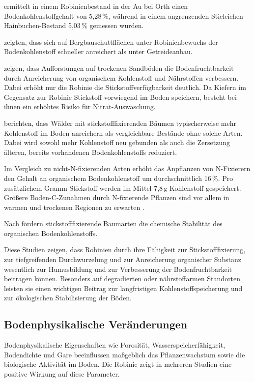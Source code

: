 \documentclass[twocolumn]{scrartcl}
\begin{document}
\citet{kastler2013robinieBoden} ermittelt in einem Robinienbestand in der Au bei Orth einen Bodenkohlenstoffgehalt von 5{,}28\,\%, während in einem angrenzenden Stieleichen-Hainbuchen-Bestand 5{,}03\,\% gemessen wurden.

\citet{kanzler2021robinieBodenc} zeigten, dass sich auf Bergbauschuttflächen unter Robinienbewuchs der Bodenkohlenstoff schneller anreichert als unter Getreideanbau.

\citet{gurlevik2016longterm} zeigen, dass Aufforstungen auf trockenen Sandböden die Bodenfruchtbarkeit durch Anreicherung von organischem Kohlenstoff und Nährstoffen verbessern. Dabei erhöht nur die Robinie die Stickstoffverfügbarkeit deutlich. Da Kiefern im Gegensatz zur Robinie Stickstoff vorwiegend im Boden speichern, besteht bei ihnen ein erhöhtes Risiko für Nitrat-Auswaschung.

\citet{resh2002nFixUndC} berichten, dass Wälder mit stickstofffixierenden Bäumen typischerweise mehr Kohlenstoff im Boden anreichern als vergleichbare Bestände ohne solche Arten. Dabei wird sowohl mehr Kohlenstoff neu gebunden als auch die Zersetzung älteren, bereits vorhandenen Bodenkohlenstoffs reduziert.

Im Vergleich zu nicht-N-fixierenden Arten erhöht das Anpflanzen von N-Fixierern den Gehalt an organischem Bodenkohlenstoff um durchschnittlich 16\,\%. Pro zusätzlichem Gramm Stickstoff werden im Mittel 7{,}8\,g Kohlenstoff gespeichert. Größere Boden-C-Zunahmen durch N-fixierende Pflanzen sind vor allem in warmen und trockenen Regionen zu erwarten \citep{sun2025nFixiUndC}.

Nach \citet{ye2024nFixCstab} fördern stickstofffixierende Baumarten die chemische Stabilität des organischen Bodenkohlenstoffs.

Diese Studien zeigen, dass Robinien durch ihre Fähigkeit zur Stickstofffixierung, zur tiefgreifenden Durchwurzelung und zur Anreicherung organischer Substanz wesentlich zur Humusbildung und zur Verbesserung der Bodenfruchtbarkeit beitragen können. Besonders auf degradierten oder nährstoffarmen Standorten leisten sie einen wichtigen Beitrag zur langfristigen Kohlenstoffspeicherung und zur ökologischen Stabilisierung der Böden.


\subsection{Bodenphysikalische Veränderungen}

Bodenphysikalische Eigenschaften wie Porosität, Wasserspeicherfähigkeit, Bodendichte und Gare beeinflussen maßgeblich das Pflanzenwachstum sowie die biologische Aktivität im Boden. Die Robinie zeigt in mehreren Studien eine positive Wirkung auf diese Parameter.
\end{document}
